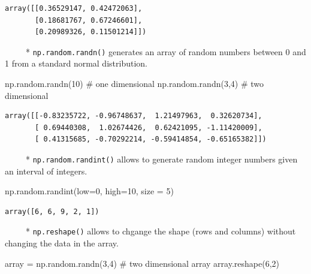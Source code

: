 \documentclass[
  letterpaper,
  DIV=11,
  numbers=noendperiod]{scrreprt}
\newenvironment{Shaded}{\begin{snugshade}}{\end{snugshade}}
\newcommand{\CommentTok}[1]{\textcolor[rgb]{0.37,0.37,0.37}{#1}}
\newcommand{\DecValTok}[1]{\textcolor[rgb]{0.68,0.00,0.00}{#1}}
\newcommand{\NormalTok}[1]{\textcolor[rgb]{0.00,0.23,0.31}{#1}}
\newcommand{\OperatorTok}[1]{\textcolor[rgb]{0.37,0.37,0.37}{#1}}
\begin{document}
\begin{verbatim}
array([[0.36529147, 0.42472063],
       [0.18681767, 0.67246601],
       [0.20989326, 0.11501214]])
\end{verbatim}

~~~~~* \texttt{np.random.randn()} generates an array of random numbers
between 0 and 1 from a standard normal distribution.

\begin{Shaded}
\begin{Highlighting}[]
\NormalTok{np.random.randn(}\DecValTok{10}\NormalTok{) }\CommentTok{\# one dimensional }
\NormalTok{np.random.randn(}\DecValTok{3}\NormalTok{,}\DecValTok{4}\NormalTok{) }\CommentTok{\# two dimensional }
\end{Highlighting}
\end{Shaded}

\begin{verbatim}
array([[-0.83235722, -0.96748637,  1.21497963,  0.32620734],
       [ 0.69440308,  1.02674426,  0.62421095, -1.11420009],
       [ 0.41315685, -0.70292214, -0.59414854, -0.65165382]])
\end{verbatim}

~~~~~* \texttt{np.random.randint()} allows to generate random integer
numbers given an interval of integers.

\begin{Shaded}
\begin{Highlighting}[]
\NormalTok{np.random.randint(low}\OperatorTok{=}\DecValTok{0}\NormalTok{, high}\OperatorTok{=}\DecValTok{10}\NormalTok{, size }\OperatorTok{=} \DecValTok{5}\NormalTok{)}
\end{Highlighting}
\end{Shaded}

\begin{verbatim}
array([6, 6, 9, 2, 1])
\end{verbatim}

~~~~~* \texttt{np.reshape()} allows to chgange the shape (rows and
columns) without changing the data in the array.

\begin{Shaded}
\begin{Highlighting}[]
\NormalTok{array }\OperatorTok{=}\NormalTok{ np.random.randn(}\DecValTok{3}\NormalTok{,}\DecValTok{4}\NormalTok{) }\CommentTok{\# two dimensional }
\NormalTok{array}
\NormalTok{array.reshape(}\DecValTok{6}\NormalTok{,}\DecValTok{2}\NormalTok{)}
\end{Highlighting}
\end{Shaded}
\end{document}
